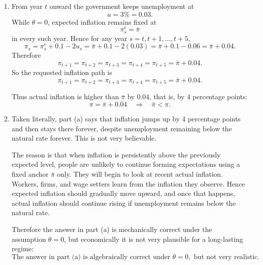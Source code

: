 \documentclass[12pt]{article}
\begin{document}
\begin{enumerate}[label=(\alph*)]
    \item
    From year \(t\) onward the government keeps unemployment at
    \[
    u=3\%=0.03.
    \]
    While \(\theta=0\), expected inflation remains fixed at
    \[
    \pi_s^e=\bar{\pi}
    \]
    in every such year. Hence for any year \(s=t,t+1,\dots,t+5\),
    \[
    \pi_s=\pi_s^e+0.1-2u_s
    =\bar{\pi}+0.1-2(0.03)
    =\bar{\pi}+0.1-0.06
    =\bar{\pi}+0.04.
    \]
    Therefore
    \[
    \pi_{t+1}=\pi_{t+2}=\pi_{t+3}=\pi_{t+4}=\pi_{t+5}=\bar{\pi}+0.04.
    \]
    So the requested inflation path is
    \[
    \boxed{\pi_{t+1}=\pi_{t+2}=\pi_{t+3}=\pi_{t+4}=\pi_{t+5}=\bar{\pi}+0.04.}
    \]

    Thus actual inflation is higher than \(\bar{\pi}\) by \(0.04\), that is, by 4 percentage points:
    \[
    \boxed{\pi=\bar{\pi}+0.04 \quad\Longrightarrow\quad \bar{\pi}<\pi.}
    \]

    \item
    Taken literally, part (a) says that inflation jumps up by 4 percentage points and then stays there forever, despite unemployment remaining below the natural rate forever. This is not very believable.

    The reason is that when inflation is persistently above the previously expected level, people are unlikely to continue forming expectations using a fixed anchor \(\bar{\pi}\) only. They will begin to look at recent actual inflation. Workers, firms, and wage setters learn from the inflation they observe. Hence expected inflation should gradually move upward, and once that happens, actual inflation should continue rising if unemployment remains below the natural rate.

    Therefore the answer in part (a) is mechanically correct under the assumption \(\theta=0\), but economically it is not very plausible for a long-lasting regime:
    \[
    \boxed{\text{The answer in part (a) is algebraically correct under }\theta=0,\text{ but not very realistic.}}
    \]


\end{enumerate}
\end{document}
